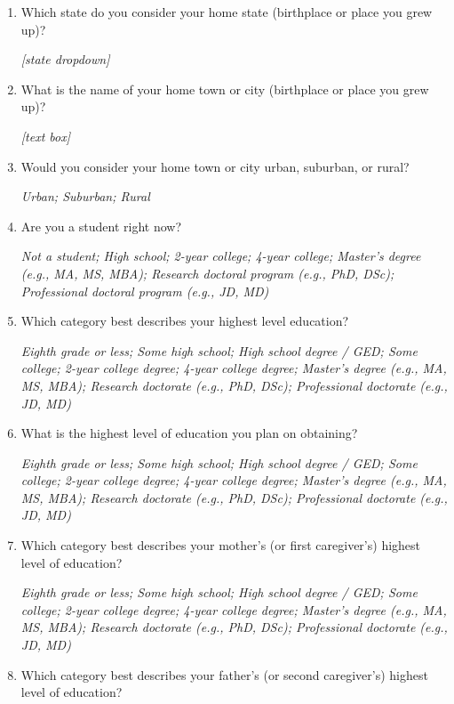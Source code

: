 \documentclass[11pt, headsepline]{article}
\begin{document}
\begin{enumerate}[resume]
    \textit{Urban; Suburban; Rural}

    \item Which state do you consider your home state (birthplace or place you grew up)?

    \textit{[state dropdown]}

    \item What is the name of your home town or city (birthplace or place you grew up)?

    \textit{[text box]}

    \item Would you consider your home town or city urban, suburban, or rural?

    \textit{Urban; Suburban; Rural}

    \item Are you a student right now?

    \textit{Not a student; High school; 2-year college; 4-year college; Master’s degree (e.g., MA, MS, MBA); Research doctoral program (e.g., PhD, DSc); Professional doctoral program (e.g., JD, MD)}

    \item Which category best describes your highest level education?

    \textit{Eighth grade or less; Some high school; High school degree / GED; Some college; 2-year college degree; 4-year college degree; Master’s degree (e.g., MA, MS, MBA); Research doctorate (e.g., PhD, DSc); Professional doctorate (e.g., JD, MD)}

    \item What is the highest level of education you plan on obtaining?

    \textit{Eighth grade or less; Some high school; High school degree / GED; Some college; 2-year college degree; 4-year college degree; Master’s degree (e.g., MA, MS, MBA); Research doctorate (e.g., PhD, DSc); Professional doctorate (e.g., JD, MD)}

    \item Which category best describes your mother's (or first caregiver's) highest level of education?

    \textit{Eighth grade or less; Some high school; High school degree / GED; Some college; 2-year college degree; 4-year college degree; Master’s degree (e.g., MA, MS, MBA); Research doctorate (e.g., PhD, DSc); Professional doctorate (e.g., JD, MD)}

    \item Which category best describes your father's (or second caregiver's) highest level of education?


\end{enumerate}
\end{document}
